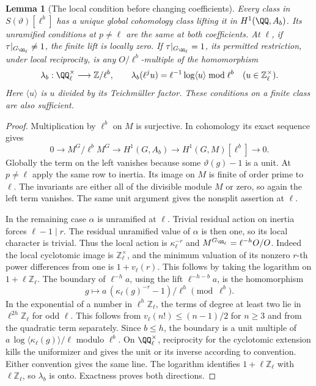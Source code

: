 \documentclass[a4paper,11pt]{article}
\newtheorem{lemma}[proposition]{Lemma}
\theoremstyle{definition}
\theoremstyle{remark}
\newcommand{\ZZ}{\mathbb Z}\newcommand{\ord}{\operatorname{ord}}
\numberwithin{equation}{section}
\begin{document}
\begin{lemma}[The local condition before changing coefficients]
\label{lem:line101}
Every class in \(S(\vartheta)[\ell^b]\) has a unique global
cohomology class lifting it in \(H^1(\QQ,A_b)\). Its unramified
conditions at \(p\ne\ell\) are the same at both coefficients.
At \(\ell\), if \(\tau|_{G_{\QQ_\ell}}\ne1\), the finite lift is
locally zero. If \(\tau|_{G_{\QQ_\ell}}=1\), its permitted
restriction, under local reciprocity, is any \(O/\ell^b\)-multiple
of the homomorphism
\begin{equation}
 \lambda_b:\QQ_\ell^\times\longrightarrow\ZZ/\ell^b,\qquad
 \lambda_b(\ell^j u)=\ell^{-1}\log\langle u\rangle\bmod\ell^b
       \quad(u\in\ZZ_\ell^\times).                             \label{eq:line101}
\end{equation}
Here \(\langle u\rangle\) is \(u\) divided by its
Teichmüller factor. These conditions on a finite class are also
sufficient.
\end{lemma}
\begin{proof}
Multiplication by \(\ell^b\) on \(M\) is surjective. In cohomology
its exact sequence gives
\[
 0\longrightarrow M^G/\ell^bM^G\longrightarrow H^1(G,A_b)
 \longrightarrow H^1(G,M)[\ell^b]\longrightarrow0.
\]
Globally the term on the left vanishes because some
\(\vartheta(g)-1\) is a unit. At \(p\ne\ell\) apply the same row
to inertia. Its image on \(M\) is finite of order prime to
\(\ell\). The invariants are either all of the divisible module
\(M\) or zero, so again the left term vanishes. The same unit
argument gives the nonsplit assertion at \(\ell\).

In the remaining case \(\alpha\) is unramified at \(\ell\).
Trivial residual action on inertia forces \(\ell-1\mid r\).
The residual unramified value of \(\alpha\) is then one, so its
local character is trivial. Thus the local action is
\(\kappa_\ell^{-r}\) and \(M^{G_{\QQ_\ell}}=\ell^{-h}O/O\).
Indeed the local cyclotomic image is \(\ZZ_\ell^\times\), and
the minimum valuation of its nonzero \(r\)-th power differences
from one is \(1+v_\ell(r)\). This follows by taking the logarithm
on \(1+\ell\ZZ_\ell\). The boundary of \(\ell^{-h}a\), using the
lift \(\ell^{-h-b}a\), is the homomorphism
\[
    g\longmapsto a\,(\kappa_\ell(g)^{-r}-1)/\ell^h
                           \pmod{\ell^b}.
\]
In the exponential of a number in \(\ell^h\ZZ_\ell\), the terms
of degree at least two lie in \(\ell^{2h}\ZZ_\ell\) for odd
\(\ell\). This follows from \(v_\ell(n!)\le(n-1)/2\) for \(n\ge3\)
and from the quadratic term separately. Since \(b\le h\), the
boundary is a unit multiple of
\(a\,\log\langle\kappa_\ell(g)\rangle/\ell\) modulo \(\ell^b\).
On \(\QQ_\ell^\times\), reciprocity for the cyclotomic extension
kills the uniformizer and gives the unit or its inverse according
to convention. Either convention gives the same line. The
logarithm identifies \(1+\ell\ZZ_\ell\) with \(\ell\ZZ_\ell\),
so \(\lambda_b\) is onto. Exactness proves both directions.
\end{proof}
\end{document}
